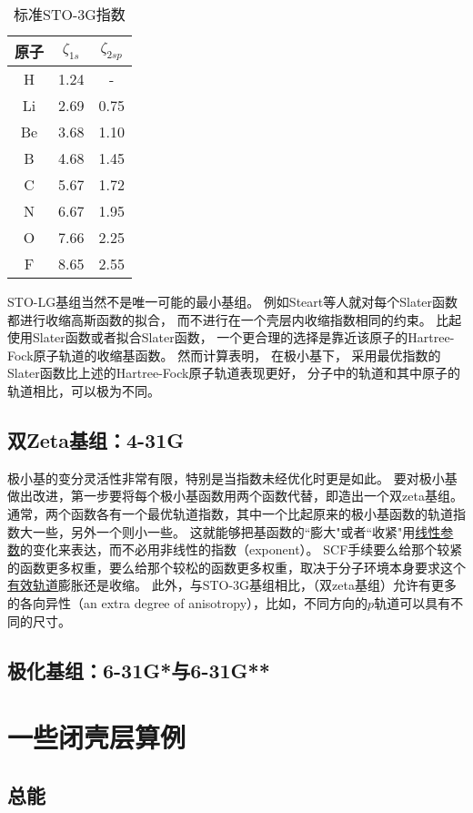 \begin{table}[h]
	\centering\caption{标准STO-3G指数}
	\begin{tabular}{ccc}
		\hline
		原子&$\zeta_{1s}$&$\zeta_{2sp}$\\\hline
		H	 &1.24&-\\
		Li	 &2.69&0.75\\		
		Be	 &3.68&1.10\\
		B	 &4.68&1.45\\
		C	 &5.67&1.72\\
		N	 &6.67&1.95\\		
		O	 &7.66&2.25\\
		F	 &8.65&2.55\\
		\hline
	\end{tabular}
	\label{t3.8}
\end{table}

STO-LG基组当然不是唯一可能的最小基组。
例如Steart等人就对每个Slater函数都进行收缩高斯函数的拟合，
而不进行在一个壳层内收缩指数相同的约束。
比起使用Slater函数或者拟合Slater函数，
一个更合理的选择是靠近该原子的Hartree-Fock原子轨道的收缩基函数。
然而计算表明，
在极小基下，
采用最优指数的Slater函数比上述的Hartree-Fock原子轨道表现更好，
分子中的轨道和其中原子的轨道相比，可以极为不同。
\subsection{双Zeta基组：4-31G}
极小基的变分灵活性非常有限，特别是当指数未经优化时更是如此。
要对极小基做出改进，第一步要将每个极小基函数用两个函数代替，即造出一个双zeta基组。
通常，两个函数各有一个最优轨道指数，其中一个比起原来的极小基函数的轨道指数大一些，另外一个则小一些。
这就能够把基函数的``膨大"或者``收紧"用\underline{线性参数}的变化来表达，而不必用非线性的指数（exponent）。
SCF手续要么给那个较紧的函数更多权重，要么给那个较松的函数更多权重，取决于分子环境本身要求这个\underline{有效轨道}膨胀还是收缩。
此外，与STO-3G基组相比，（双zeta基组）允许有更多的各向异性（an extra degree of anisotropy），比如，不同方向的$p$轨道可以具有不同的尺寸。

\subsection{极化基组：6-31G*与6-31G**}
\section{一些闭壳层算例}
\subsection{总能}
